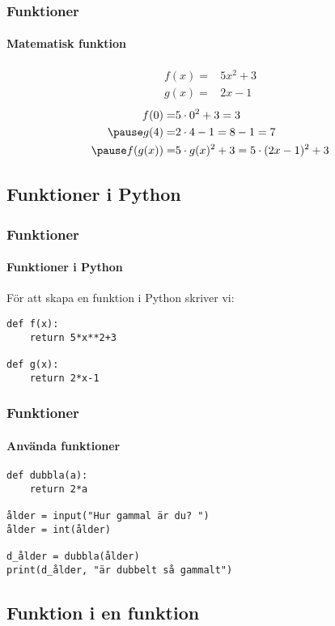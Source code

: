 \documentclass[aspectratio=169]{beamer}
\begin{document}
\begin{frame}
	\frametitle{Funktioner}
	\framesubtitle{Matematisk funktion}
	
	\begin{equation*}
		\begin{aligned}
			f(x) = & 5x^2+3\\
			g(x) = & 2x-1
		\end{aligned}
	\end{equation*}
	\pause
	\begin{equation*}
		\begin{aligned}
			f(0) = & 5\cdot 0^2 +3 = 3\\ \pause
			g(4) = & 2\cdot 4 - 1 = 8 - 1 = 7\\ \pause
			f(g(x)) = & 5\cdot g(x)^2+3 = 5\cdot (2x-1)^2+3
		\end{aligned}
	\end{equation*}
	
\end{frame}

\subsection{Funktioner i Python}

\begin{frame}[fragile]
	\frametitle{Funktioner}
	\framesubtitle{Funktioner i Python}
	
	För att skapa en funktion i Python skriver vi:
	
	\begin{lstlisting}
def f(x):
    return 5*x**2+3

def g(x):
    return 2*x-1
	\end{lstlisting}

\end{frame}

\begin{frame}[fragile]
	\frametitle{Funktioner}
	\framesubtitle{Använda funktioner}
	
	\begin{lstlisting}
def dubbla(a):
    return 2*a
    
ålder = input("Hur gammal är du? ")
ålder = int(ålder)

d_ålder = dubbla(ålder)
print(d_ålder, "är dubbelt så gammalt")
	\end{lstlisting}
	
\end{frame}

\subsection{Funktion i en funktion}
\end{document}
